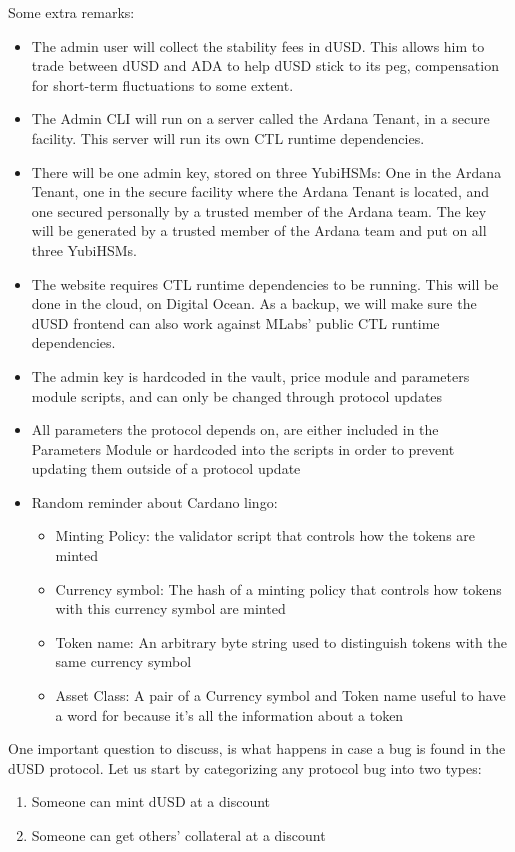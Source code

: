 \documentclass{article} %
\begin{document}
Some extra remarks:
\begin{itemize}
  \item The admin user will collect the stability fees in dUSD. This allows him
    to trade between dUSD and ADA to help dUSD stick to its peg, compensation
    for short-term fluctuations to some extent.
  \item The Admin CLI will run on a server called the Ardana Tenant, in a secure
    facility. This server will run its own CTL runtime dependencies.
  \item There will be one admin key, stored on three YubiHSMs: One in the Ardana
    Tenant, one in the secure facility where the Ardana Tenant is located, and
    one secured personally by a trusted member of the Ardana team. The key will
    be generated by a trusted member of the Ardana team and put on all three
    YubiHSMs.
  \item The website requires CTL runtime dependencies to be running. This will
    be done in the cloud, on Digital Ocean. As a backup, we will make sure the
    dUSD frontend can also work against MLabs' public CTL runtime dependencies.
  \item The admin key is hardcoded in the vault, price module and parameters
    module scripts, and can only be changed through protocol updates
  \item All parameters the protocol depends on, are either included in the
    Parameters Module or hardcoded into the scripts in order to prevent updating
    them outside of a protocol update
  \item Random reminder about Cardano lingo:
    \begin{itemize}
      \item Minting Policy: the validator script that controls how the tokens
        are minted
      \item Currency symbol: The hash of a minting policy that controls how
        tokens with this currency symbol are minted
      \item Token name: An arbitrary byte string used to distinguish tokens with
        the same currency symbol
      \item Asset Class: A pair of a Currency symbol and Token name useful to
    have a word for because it's all the information about a token
    \end{itemize}
\end{itemize}

One important question to discuss, is what happens in case a bug is found in the
dUSD protocol. Let us start by categorizing any protocol bug into two types:
\begin{enumerate}
  \item Someone can mint dUSD at a discount
  \item Someone can get others' collateral at a discount
\end{enumerate}
\end{document}
